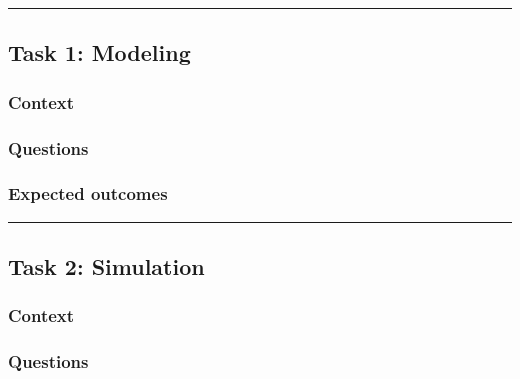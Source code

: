 \documentclass[]{book}
\theoremstyle{definition}
\theoremstyle{definition}
\theoremstyle{definition}
\theoremstyle{remark}
\begin{document}
\begin{center}\rule{0.5\linewidth}{\linethickness}\end{center}

\hypertarget{task-1-modeling-1}{%
\subsection*{Task 1: Modeling}\label{task-1-modeling-1}}

\hypertarget{context-9}{%
\subsubsection*{Context}\label{context-9}}

\hypertarget{questions-8}{%
\subsubsection*{Questions}\label{questions-8}}

\hypertarget{expected-outcomes-8}{%
\subsubsection*{Expected outcomes}\label{expected-outcomes-8}}

\begin{center}\rule{0.5\linewidth}{\linethickness}\end{center}

\hypertarget{task-2-simulation-1}{%
\subsection*{Task 2: Simulation}\label{task-2-simulation-1}}

\hypertarget{context-10}{%
\subsubsection*{Context}\label{context-10}}

\hypertarget{questions-9}{%
\subsubsection*{Questions}\label{questions-9}}
\end{document}
